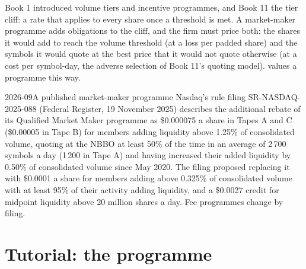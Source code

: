 Book 1 introduced volume tiers and incentive programmes, and Book 11 the tier cliff: a rate that applies to every share once a threshold is met.
A market-maker programme adds obligations to the cliff, and the firm must price both: the shares it would add to reach the volume threshold (at a
loss per padded share) and the symbols it would quote at the best price that it would not quote otherwise (at a cost per symbol-day, the adverse
selection of Book 11's quoting model).  values a programme this way.

\label{lst:fm:commercial-relationships-with-venues-brokers-and-vendors:value}

\begin{dated}{2026-09}{A published market-maker programme}\label{dat:fm:commercial-relationships-with-venues-brokers-and-vendors:qmm}
Nasdaq's rule filing SR-NASDAQ-2025-088 (Federal Register, 19 November 2025) describes the additional rebate of its Qualified Market Maker
programme as \$0.000075 a share in Tapes A and C (\$0.00005 in Tape B) for members adding liquidity above 1.25\% of consolidated volume, quoting at
the NBBO at least 50\% of the time in an average of 2\,700 symbols a day (1\,200 in Tape A) and having increased their added liquidity by 0.50\% of
consolidated volume since May 2020. The filing proposed replacing it with \$0.0001 a share for members adding above 0.325\% of consolidated volume
with at least 95\% of their activity adding liquidity, and a \$0.0027 credit for midpoint liquidity above 20 million shares a day. Fee programmes
change by filing.
\end{dated}

\section{Tutorial: the programme}\label{tut:fm:commercial-relationships-with-venues-brokers-and-vendors:tut}

